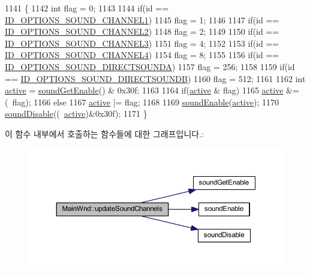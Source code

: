 \begin{DoxyCode}
1141 \{
1142   \textcolor{keywordtype}{int} flag = 0;
1143       
1144   \textcolor{keywordflow}{if}(\textcolor{keywordtype}{id} == \mbox{\hyperlink{resource_8h_a83883765782ec73d31d7964f7eb9fbce}{ID\_OPTIONS\_SOUND\_CHANNEL1}})
1145     flag = 1;
1146 
1147   \textcolor{keywordflow}{if}(\textcolor{keywordtype}{id} == \mbox{\hyperlink{resource_8h_a4122313efe433202bea76a7c256ac41f}{ID\_OPTIONS\_SOUND\_CHANNEL2}})
1148     flag = 2;
1149 
1150   \textcolor{keywordflow}{if}(\textcolor{keywordtype}{id} == \mbox{\hyperlink{resource_8h_a10ba0f6233fcb9ef7e885267f0f9b951}{ID\_OPTIONS\_SOUND\_CHANNEL3}})
1151     flag = 4;
1152 
1153   \textcolor{keywordflow}{if}(\textcolor{keywordtype}{id} == \mbox{\hyperlink{resource_8h_a2bbf6668c3d516efbd37911405a727e4}{ID\_OPTIONS\_SOUND\_CHANNEL4}})
1154     flag = 8;
1155 
1156   \textcolor{keywordflow}{if}(\textcolor{keywordtype}{id} == \mbox{\hyperlink{resource_8h_a95000ddb4524a3566c234b09a7c9b825}{ID\_OPTIONS\_SOUND\_DIRECTSOUNDA}})
1157     flag = 256;
1158 
1159   \textcolor{keywordflow}{if}(\textcolor{keywordtype}{id} == \mbox{\hyperlink{resource_8h_a9d78136742bd464a8e37ca8eeda3555a}{ID\_OPTIONS\_SOUND\_DIRECTSOUNDB}})
1160     flag = 512;
1161 
1162   \textcolor{keywordtype}{int} \mbox{\hyperlink{_s_d_l_8cpp_aa5805c5e936174e5092bf7a5b78e7e64}{active}} = \mbox{\hyperlink{_sound_8cpp_a3d1f6129176583804274bb162c3428a8}{soundGetEnable}}() & 0x30f;
1163 
1164   \textcolor{keywordflow}{if}(\mbox{\hyperlink{_s_d_l_8cpp_aa5805c5e936174e5092bf7a5b78e7e64}{active}} & flag)
1165     \mbox{\hyperlink{_s_d_l_8cpp_aa5805c5e936174e5092bf7a5b78e7e64}{active}} &= (~flag);
1166   \textcolor{keywordflow}{else}
1167     \mbox{\hyperlink{_s_d_l_8cpp_aa5805c5e936174e5092bf7a5b78e7e64}{active}} |= flag;
1168   
1169   \mbox{\hyperlink{_sound_8cpp_aa3562ee185ac50bb560c6a034475bd18}{soundEnable}}(\mbox{\hyperlink{_s_d_l_8cpp_aa5805c5e936174e5092bf7a5b78e7e64}{active}});
1170   \mbox{\hyperlink{_sound_8cpp_ac659f56970310e671066599c629618b5}{soundDisable}}((~\mbox{\hyperlink{_s_d_l_8cpp_aa5805c5e936174e5092bf7a5b78e7e64}{active}})&0x30f);
1171 \}
\end{DoxyCode}
이 함수 내부에서 호출하는 함수들에 대한 그래프입니다.\+:
\nopagebreak
\begin{figure}[H]
\begin{center}
\leavevmode
\includegraphics[width=350pt]{class_main_wnd_a30b67d9db53d79122684a81e549ebd1c_cgraph}
\end{center}
\end{figure}
